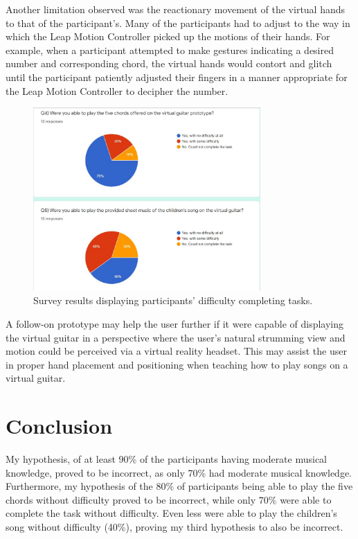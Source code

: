 \documentclass{vgtc}                          %
\begin{document}
Another limitation observed was the reactionary movement of the virtual hands to that of the participant's. Many of the participants had to adjust to the way in which the Leap Motion Controller picked up the motions of their hands. For example, when a participant attempted to make gestures indicating a desired number and corresponding chord, the virtual hands would contort and glitch until the participant patiently adjusted their fingers in a manner appropriate for the Leap Motion Controller to decipher the number.

\begin{figure}[h]
\centering
\includegraphics[height=7cm]{pictures/Survey_Difficulty.JPG}
\centering
\caption{Survey results displaying participants' difficulty completing tasks.}
\end{figure}

A follow-on prototype may help the user further if it were capable of displaying the virtual guitar in a perspective where the user's natural strumming view and motion could be perceived via a virtual reality headset.  This may assist the user in proper hand placement and positioning when teaching how to play songs on a virtual guitar.

\section{Conclusion}
My hypothesis, of at least 90\% of the participants having moderate musical knowledge, proved to be incorrect, as only 70\% had moderate musical knowledge. Furthermore, my hypothesis of the 80\% of participants being able to play the five chords without difficulty proved to be incorrect, while only 70\% were able to complete the task without difficulty. Even less were able to play the children's song without difficulty (40\%), proving my third hypothesis to also be incorrect. 
\end{document}
